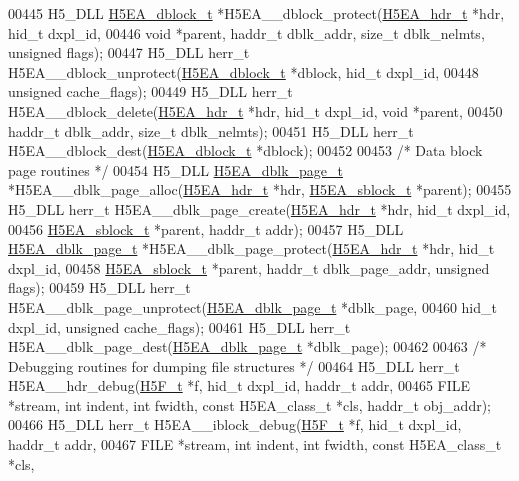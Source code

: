 \begin{DoxyCode}
00445 H5\_DLL \hyperlink{struct_h5_e_a__dblock__t}{H5EA\_dblock\_t} *H5EA\_\_dblock\_protect(\hyperlink{struct_h5_e_a__hdr__t}{H5EA\_hdr\_t} *hdr, hid\_t dxpl\_id,
00446     \textcolor{keywordtype}{void} *parent, haddr\_t dblk\_addr, \textcolor{keywordtype}{size\_t} dblk\_nelmts, \textcolor{keywordtype}{unsigned} flags);
00447 H5\_DLL herr\_t H5EA\_\_dblock\_unprotect(\hyperlink{struct_h5_e_a__dblock__t}{H5EA\_dblock\_t} *dblock, hid\_t dxpl\_id,
00448     \textcolor{keywordtype}{unsigned} cache\_flags);
00449 H5\_DLL herr\_t H5EA\_\_dblock\_delete(\hyperlink{struct_h5_e_a__hdr__t}{H5EA\_hdr\_t} *hdr, hid\_t dxpl\_id, \textcolor{keywordtype}{void} *parent,
00450     haddr\_t dblk\_addr, \textcolor{keywordtype}{size\_t} dblk\_nelmts);
00451 H5\_DLL herr\_t H5EA\_\_dblock\_dest(\hyperlink{struct_h5_e_a__dblock__t}{H5EA\_dblock\_t} *dblock);
00452 
00453 \textcolor{comment}{/* Data block page routines */}
00454 H5\_DLL \hyperlink{struct_h5_e_a__dbk__page__t}{H5EA\_dblk\_page\_t} *H5EA\_\_dblk\_page\_alloc(\hyperlink{struct_h5_e_a__hdr__t}{H5EA\_hdr\_t} *hdr, 
      \hyperlink{struct_h5_e_a__sblock__t}{H5EA\_sblock\_t} *parent);
00455 H5\_DLL herr\_t H5EA\_\_dblk\_page\_create(\hyperlink{struct_h5_e_a__hdr__t}{H5EA\_hdr\_t} *hdr, hid\_t dxpl\_id,
00456     \hyperlink{struct_h5_e_a__sblock__t}{H5EA\_sblock\_t} *parent, haddr\_t addr);
00457 H5\_DLL \hyperlink{struct_h5_e_a__dbk__page__t}{H5EA\_dblk\_page\_t} *H5EA\_\_dblk\_page\_protect(\hyperlink{struct_h5_e_a__hdr__t}{H5EA\_hdr\_t} *hdr, hid\_t dxpl\_id,
00458     \hyperlink{struct_h5_e_a__sblock__t}{H5EA\_sblock\_t} *parent, haddr\_t dblk\_page\_addr, \textcolor{keywordtype}{unsigned} flags);
00459 H5\_DLL herr\_t H5EA\_\_dblk\_page\_unprotect(\hyperlink{struct_h5_e_a__dbk__page__t}{H5EA\_dblk\_page\_t} *dblk\_page,
00460     hid\_t dxpl\_id, \textcolor{keywordtype}{unsigned} cache\_flags);
00461 H5\_DLL herr\_t H5EA\_\_dblk\_page\_dest(\hyperlink{struct_h5_e_a__dbk__page__t}{H5EA\_dblk\_page\_t} *dblk\_page);
00462 
00463 \textcolor{comment}{/* Debugging routines for dumping file structures */}
00464 H5\_DLL herr\_t H5EA\_\_hdr\_debug(\hyperlink{struct_h5_f__t}{H5F\_t} *f, hid\_t dxpl\_id, haddr\_t addr,
00465     FILE *stream, \textcolor{keywordtype}{int} indent, \textcolor{keywordtype}{int} fwidth, \textcolor{keyword}{const} H5EA\_class\_t *cls, haddr\_t obj\_addr);
00466 H5\_DLL herr\_t H5EA\_\_iblock\_debug(\hyperlink{struct_h5_f__t}{H5F\_t} *f, hid\_t dxpl\_id, haddr\_t addr,
00467     FILE *stream, \textcolor{keywordtype}{int} indent, \textcolor{keywordtype}{int} fwidth, \textcolor{keyword}{const} H5EA\_class\_t *cls,

\end{DoxyCode}
